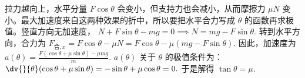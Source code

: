 拉力越向上，水平分量 \(F\cos\theta\) 会变小，但支持力也会减小，从而摩擦力 \(\mu N\) 变小。最大加速度来自这两种效果的折中，所以要把水平合力写成 \(\theta\) 的函数再求极值。竖直方向无加速度，
 \(N+F\sin\theta-mg=0 \implies N=mg-F\sin\theta.\) 
转到水平方向，合力为
 \(F_{\text{合},x}=F\cos\theta-\mu N =F\cos\theta-\mu(mg-F\sin\theta).\) 
因此，加速度为
 \(a(\theta)=\frac{F(\cos\theta+\mu\sin\theta)-\mu mg}{m}.\) 
\(a(\theta)\) 关于 \(\theta\) 的极值条件为：
 \(\dv{}{\theta}(\cos\theta+\mu\sin\theta) =-\sin\theta+\mu\cos\theta=0.\) 
于是解得
 \(\tan\theta=\mu.\) 

